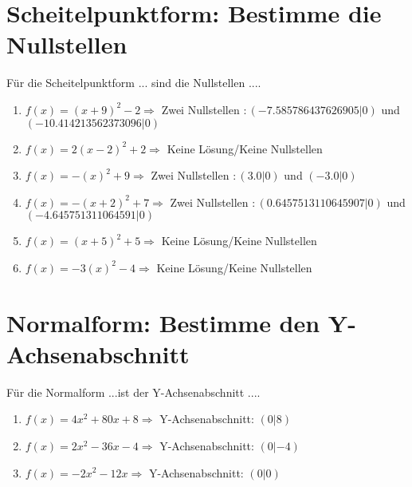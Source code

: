 \documentclass{article}%
\begin{document}
\section{Scheitelpunktform: Bestimme die Nullstellen}%
\label{sec:ScheitelpunktformBestimmedieNullstellen}%
Für die Scheitelpunktform ... sind die Nullstellen ....%
\begin{enumerate}[label=\alph*)]%
\item%
\newline\vspace{0.5cm}$f(x)=(x+9)^2 -2 \Rightarrow $ Zwei Nullstellen $: (-7.585786437626905|0) $ und $ (-10.414213562373096|0) $%
\item%
\newline\vspace{0.5cm}$f(x)=2(x-2)^2 +2 \Rightarrow  $ Keine Lösung/Keine Nullstellen $ $%
\item%
\newline\vspace{0.5cm}$f(x)=-(x)^2 +9 \Rightarrow $ Zwei Nullstellen $: (3.0|0) $ und $ (-3.0|0) $%
\item%
\newline\vspace{0.5cm}$f(x)=-(x+2)^2 +7 \Rightarrow $ Zwei Nullstellen $: (0.6457513110645907|0) $ und $ (-4.645751311064591|0) $%
\item%
\newline\vspace{0.5cm}$f(x)=(x+5)^2 +5 \Rightarrow  $ Keine Lösung/Keine Nullstellen $ $%
\item%
\newline\vspace{0.5cm}$f(x)=-3(x)^2 -4 \Rightarrow  $ Keine Lösung/Keine Nullstellen $ $%
\end{enumerate}

%
\section{Normalform: Bestimme den Y{-}Achsenabschnitt}%
\label{sec:NormalformBestimmedenY{-}Achsenabschnitt}%
Für die Normalform ...ist der Y{-}Achsenabschnitt ....%
\begin{enumerate}[label=\alph*)]%
\item%
\newline\vspace{0.5cm}$f(x)=4x^2 + 80x + 8 \Rightarrow $ Y-Achsenabschnitt: $ (0|8) $%
\item%
\newline\vspace{0.5cm}$f(x)=2x^2 - 36x - 4 \Rightarrow $ Y-Achsenabschnitt: $ (0|-4) $%
\item%
\newline\vspace{0.5cm}$f(x)=-2x^2 - 12x \Rightarrow $ Y-Achsenabschnitt: $ (0|0) $%
\end{enumerate}
\end{document}
